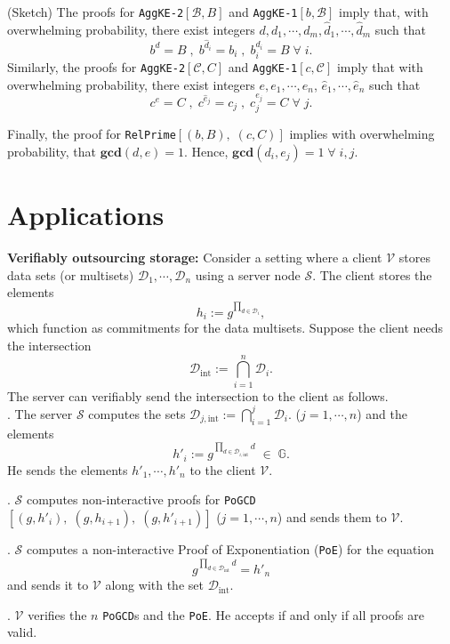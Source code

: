 \documentclass[11pt, lettersize, notitlepage, leqno, footskip=0.6cm]{article}
\newcommand{\pl}{\prod\limits}
\newcommand{\mc}{\mathcal}
\newcommand{\mb}{\mathbb}
\newcommand{\mbf}{\mathbf}
\newcommand{\mr}{\mathrm}
\newcommand{\what}{\widehat}
\newcommand{\V}{\mc{V}}
\newcommand{\vs}{\vspace{-0.15cm}}
\newcommand{\noin}{\noindent}
\newcommand{\op}{overwhelming probability}
\newcommand{\GCD}{\mbf{gcd}}
\numberwithin{equation}{section}
\begin{document}
\begin{prf} (Sketch) The proofs for \verb|AggKE-2|$[\mc{B}, B]$ and \verb|AggKE-1|$[b,\mc{B}]$ imply that, with overwhelming probability, there exist integers $d,d_1,\cdots,d_m,\what{d}_1,\cdots,\what{d}_m$ such that \vs $$b^d = B\;,\; b^{\what{d}_i}= b_i\;,\; b_i^{d_i}= B\;\forall\; i.$$ Similarly, the proofs for \verb|AggKE-2|$[\mc{C}, C]$ and \verb|AggKE-1|$[c,\mc{C}]$ imply that with overwhelming probability, there exist integers $e,e_1,\cdots,e_n$, $\what{e}_1,\cdots,\what{e}_n$ such that \vs $$c^e = C\;,\; c^{\what{e}_j}= c_j\;,\;c_j^{e_j}= C\;\forall\; j.$$ 

Finally, the proof for \verb|RelPrime|$[(b,B),\;(c,C)]$ implies with \op, that $\GCD(d,e) = 1$. Hence, $\GCD(d_i,e_j) = 1\;\forall\;i,j$.

\end{prf}

\bigskip

\section{\fontsize{11}{11} Applications}



\noin \textbf{Verifiably outsourcing storage:} Consider a setting where a client $\mc{V}$ stores data sets (or multisets) $\mc{D}_1, \cdots, \mc{D}_n$ using a server node $\mc{S}$. The client stores the elements \vs $$h_i:= g^{\pl_{d\in\mc{D}_i}},$$ which function as commitments for the data multisets. Suppose the client needs the intersection \vs $$\mc{D}_{\mr{int}}:=\bigcap\limits_{i=1}^n \mc{D}_i .$$ The server can verifiably send the intersection to the client as follows.\\

\noin 1. The server $\mc{S}$ computes the sets $\mc{D}_{j,\mr{int}}:= \bigcap\limits_{i=1}^j \mc{D}_i .$ ($j=1,\cdots,n$) and the elements \vs $$ h'_i:=  g^{\pl_{d\in\mc{D}_{i,\mr{int}}} d}\;\in\;\mb{G}.$$ He sends the elements $h'_1,\cdots, h'_{n}$ to the client $\V$.

\noin 2. $\mc{S}$ computes non-interactive proofs for \verb|PoGCD|$[(g,h'_i),\;(g, h_{i+1}),\; (g, h'_{i+1})]$ ($j=1,\cdots,n$) and sends them to $\V$.

\noin 3. $\mc{S}$ computes a non-interactive Proof of Exponentiation (\verb|PoE|) for the equation \vs $$g^{\pl_{d\in \mc{D}_{\mr{int}}}d} = h'_n $$ and sends it to $\V$ along with the set $\mc{D}_{\mr{int}}$.

\noin 4. $\V$ verifies the $n$ \verb|PoGCD|s and the \verb|PoE|. He accepts if and only if all proofs are valid.
\end{document}
